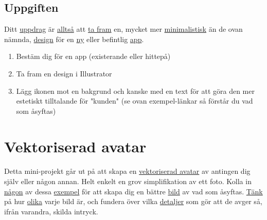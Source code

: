\documentclass{article}
\begin{document}
    \subsection*{ Uppgiften }
      Ditt
      \href{http://dribbble.com/shots/1013293-App-Branding?list=searches}{uppdrag}
      är
      \href{http://dribbble.com/shots/988508-Simple-iOS-Icons?list=searches}{alltså}
      att 
      \href{http://dribbble.com/shots/1043059-iDo-app-icon?list=searches}{ta fram}
      en, mycket mer
      \href{http://dribbble.com/shots/1139639-Heart-Icon?list=searches}{minimalistisk}
      än de ovan nämnda,
      \href{http://www.behance.net/gallery/Transparent-App-Icon/10898437}{design}
      för en
      \href{http://www.behance.net/gallery/Simple-Weather-App/10738379}{ny}
      eller befintlig
      \href{http://www.behance.net/gallery/Flat-icon/10071269}{app}.
      \begin{enumerate}
        \item Bestäm dig för en app (existerande eller hittepå)
        \item Ta fram en design i Illustrator
        \item Lägg ikonen mot en bakgrund och kanske med en text för att göra den mer estetiskt tilltalande för "kunden" (se ovan exempel-länkar så förstår du vad som åsyftas)
      \end{enumerate}



  \newpage
  \section{ Vektoriserad avatar }
    \paragraph{}
    Detta mini-projekt går ut på att skapa en
    \href{http://vector.tutsplus.com/tutorials/tools-tips/quick-tip-rapid-vector-portrait-process/}{vektoriserad avatar}
    av antingen dig själv eller någon annan. Helt enkelt en grov simplifikation av ett foto. Kolla in
    \href{http://chiragtheoo7.deviantart.com/art/vector-girl-face-173563059}{någon}
    av dessa
    \href{http://fad02fad.deviantart.com/art/Marilyn-Monroe-354215090}{exempel}
    för att skapa dig en bättre
    \href{http://oddhouse.deviantart.com/art/Portrait-70809410}{bild}
    av vad som åsyftas.
    \href{http://foolecho.deviantart.com/art/Be-188800517}{Tänk}
    på hur
    \href{http://j3concepts.deviantart.com/art/Self-Portrait-April-09-117753384}{olika}
    varje bild är, och fundera över vilka
    \href{http://farm2.static.flickr.com/1336/5163223561_ce4751bb83.jpg}{detaljer}
    som gör att de avger så, ifrån varandra, skilda intryck.
\end{document}
